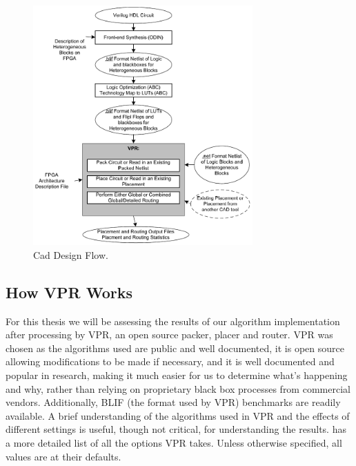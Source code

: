 \documentclass[12pt,final,oneside]{dwThesis} %
\begin{document}
   \begin{figure}
      \begin{center}
         \includegraphics[width=0.75\textwidth]{images/vpr-cad.png}
         \caption{Cad Design Flow.\cite{VPRManual}}
         \label{CADFlow}
      \end{center}
   \end{figure}
   \subsection{How \gls{VPR} Works}\label{VPRSection}
   For this thesis we will be assessing the results of our algorithm implementation after processing by \gls{VPR}, an open source packer, placer and router. \gls{VPR} was chosen as the algorithms used are public and well documented, it is open source allowing modifications to be made if necessary, and it is well documented and popular in research, making it much easier for us to determine what's happening and why, rather than relying on proprietary black box processes from commercial vendors. Additionally, \gls{BLIF} (the format used by \gls{VPR}) benchmarks are readily available.
   A brief understanding of the algorithms used in \gls{VPR} and the effects of different settings is useful, though not critical, for understanding the results. \cite{VPRManual} has a more detailed list of all the options \gls{VPR} takes. Unless otherwise specified, all values are at their defaults.
\end{document}
